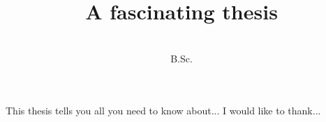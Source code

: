 \documentclass[a4paper,12pt,openright,twoside]{adfathesis}
\title{A fascinating thesis}
\author{\Authornameonly \\ B.Sc.}
\begin{document}
\beforepreface
  This thesis tells you all you need to know about...
  I would like to thank...
\afterpreface








\appendix






\clearpage
{}


\end{document}

